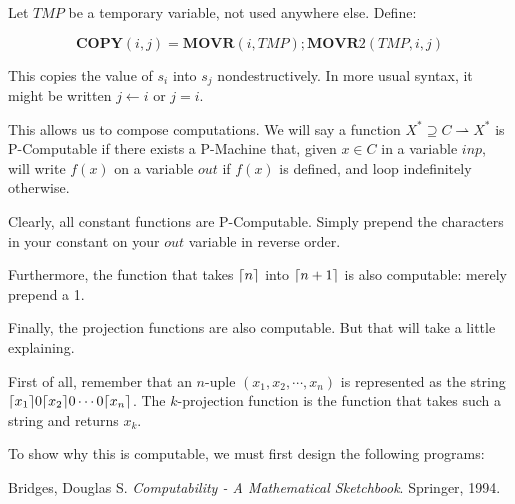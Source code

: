 \documentclass{article}
\DeclarePairedDelimiter{\ceil}{\lceil}{\rceil}
\newcommand{\MOVR}{\mathbf{MOVR}}
\newcommand{\COPY}{\mathbf{COPY}}
\begin{document}
	Let $TMP$ be a temporary variable, not used anywhere else. Define:
	
	\[\COPY(i, j) = \MOVR(i, TMP); \MOVR2(TMP, i, j)\]
	
	This copies the value of $s_i$ into $s_j$ nondestructively. In more usual syntax, it might be written $j \leftarrow i$ or $j = i$.
	
	This allows us to compose computations. We will say a function $X^* \supseteq C \rightharpoonup X^*$ is P-Computable if there exists a P-Machine that, given $x \in C$ in a variable $inp$, will write $f(x)$ on a variable $out$ if $f(x)$ is defined, and loop indefinitely otherwise.
	
	Clearly, all constant functions are P-Computable. Simply prepend the characters in your constant on your $out$ variable in reverse order.
	
	Furthermore, the function that takes $\ceil{n}$ into $\ceil{n+1}$ is also computable: merely prepend a 1.
	
	Finally, the projection functions are also computable. But that will take a little explaining.
	
	First of all, remember that an $n$-uple $(x_1, x_2, \cdots, x_n)$ is represented as the string $\ceil{x_1}0\ceil{x_2}0\cdots0\ceil{x_n}$. The $k$-projection function is the function that takes such a string and returns $x_k$.
	
	To show why this is computable, we must first design the following programs:
	
	
	
	
\begin{thebibliography}{9}
Bridges, Douglas S.
\textit{Computability - A Mathematical Sketchbook}. 
Springer, 1994. %
\end{thebibliography}	
\end{document}
